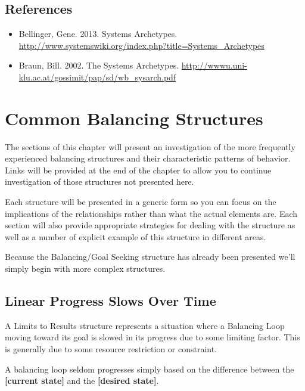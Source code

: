 \documentclass[]{memoir}
\newcommand{\p}[1]{\textbf{{[}#1{]}}}
\begin{document}
\section{References}

\begin{itemize}
\itemsep1pt\parskip0pt
\item
  Bellinger, Gene. 2013. Systems Archetypes.
  \url{http://www.systemswiki.org/index.php?title=Systems_Archetypes}
\item
  Braun, Bill. 2002. The Systems Archetypes.
  \url{http://wwwu.uni-klu.ac.at/gossimit/pap/sd/wb_sysarch.pdf}
\end{itemize}

\chapter{Common Balancing Structures}

The sections of this chapter will present an investigation of the more
frequently experienced balancing structures and their characteristic
patterns of behavior. Links will be provided at the end of the chapter
to allow you to continue investigation of those structures not presented
here.

Each structure will be presented in a generic form so you can focus on
the implications of the relationships rather than what the actual
elements are. Each section will also provide appropriate strategies for
dealing with the structure as well as a number of explicit example of
this structure in different areas.

Because the Balancing/Goal Seeking structure has already been presented
we'll simply begin with more complex structures.

\section{Linear Progress Slows Over Time}

A Limits to Results structure represents a situation where a Balancing
Loop moving toward its goal is slowed in its progress due to some
limiting factor. This is generally due to some resource restriction or
constraint.

\FloatBarrier 

\begin{model}[frametitle={Model: Limits to Results}] 

 A balancing loop seldom progresses simply based on the difference between the \p{current state} and the \p{desired state}.




 \end{model}
\end{document}
